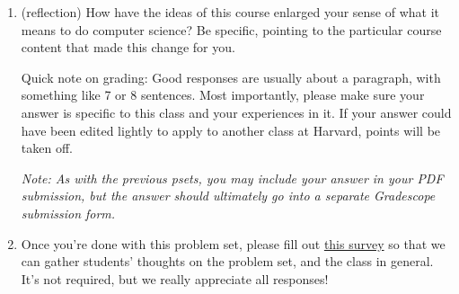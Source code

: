 \documentclass[11pt]{article}
\begin{document}
\begin{enumerate}
\begin{enumerate}
    \vspace{0.1in}

    \textbf{Your goal:} Prove the correctness of the algorithm (explicitly showing why the algorithm satisfies C1,C2,C3). \textit{Max one page}

    \label{part:simulate}

    \item Using Part~\ref{part:simulate} and the undecidability of HaltOnEmpty for RAM programs, prove that the following computational problem is unsolvable:

    \compprob{\ArithmeticOverflow}
    {A Word-RAM program $P$}
    {$\yes$ if there is a word length $w$ such that $P[w]$ has an arithmetic overflow when run on input $\eps$, $\no$ otherwise}

    \item
    \label{itm:AOsolvable}
    Show that the ArithmeticOverflow problem is solvable if we fix the word length $w$:
    \compprob{\ArithmeticOverflowFixedWordLength}
    {A Word-RAM program $P$ and a word length $w$}
    {$\yes$ if $P[w]$ has an arithmetic overflow when run on input $\eps$, $\no$ otherwise}
    \textit{Max one page}

    \item (optional\footnote{This problem won't make a difference between N, L, R-, and R grades. As this problem is purely extra credit, course staff will deprioritize questions about this problem at office hours and on Ed.}) Show that \ArithmeticOverflowFixedWordLength\ is $\NP$-hard.  (In fact, it is much harder than $\NP$-hard and is provably not in $\Ptime$, but this fact is beyond the scope of this course.)  \textit{Max one page}

\end{enumerate}

\item (reflection)  How have the ideas of this course enlarged your sense of what it means to do computer science?  Be specific, pointing to the particular course content that made this change for you.

Quick note on grading: Good responses are usually about a paragraph, with something like 7 or 8 sentences. Most importantly, please make sure your answer is specific to this class and your experiences in it. If your answer could have been edited lightly to apply to another class at Harvard, points will be taken off.

\textit{Note: As with the previous psets, you may include your answer in your PDF submission, but the answer should ultimately go into a separate Gradescope submission form.}

\item Once you're done with this problem set, please fill out \href{https://forms.gle/TufVrmbtN8W1JqSe6}{this survey} so that we can gather students' thoughts on the problem set, and the class in general. It's not required, but we really appreciate all responses!

\end{enumerate}
\end{document}
